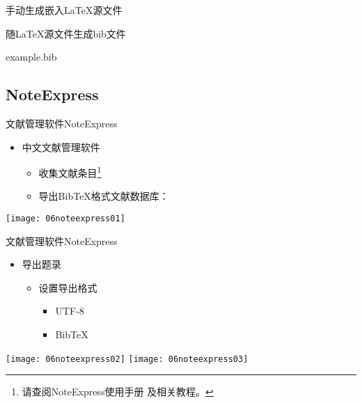 \documentclass[fontset = none, t]{ctexbeamer}
\begin{document}
\begin{frame}[fragile]{手动生成}{嵌入\LaTeX 源文件}
\begin{spacing}{1.3}
\begin{center}
\begin{minipage}[h]{0.55\linewidth}
\begin{textcb}{随\LaTeX 源文件生成bib文件}
\begin{filecontents}{example.bib}
\subsection[NoteExpress]{NoteExpress}
\begin{frame}[fragile]{文献管理软件}{NoteExpress}
  \begin{spacing}{1.5}
    \begin{itemize}
    \item 中文文献管理软件
      \begin{itemize}
      \item 收集文献条目\footnote[frame, 2]{请查阅NoteExpress使用手册
          及相关教程。}
      \item 导出Bib\TeX 格式文献数据库：
      \end{itemize}
    \end{itemize}    
    \begin{center}
      \texttt{[image: 06noteexpress01]}
    \end{center}
  \end{spacing}
\end{frame}

\begin{frame}[fragile]{文献管理软件}{NoteExpress}
  \begin{spacing}{1.2}
    \begin{itemize}
    \item 导出题录
      \begin{itemize}
      \item 设置导出格式
        \begin{itemize}
        \item UTF-8
        \item Bib\TeX
        \end{itemize}
      \end{itemize}
    \end{itemize}
    \begin{center}
      \texttt{[image: 06noteexpress02]}
      \texttt{[image: 06noteexpress03]}
    \end{center}
  \end{spacing}
\end{frame}


\end{filecontents}
\end{textcb}
\end{minipage}
\end{center}
\end{spacing}
\end{frame}
\end{document}
